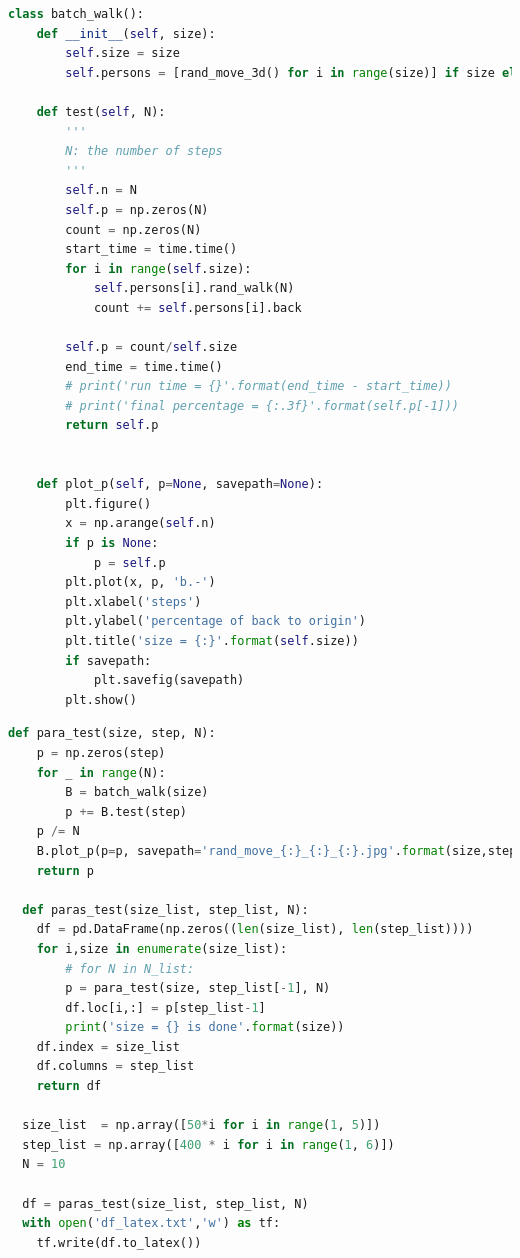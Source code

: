 \documentclass[12pt]{article}
\begin{document}
\begin{lstlisting}[language=Python, caption = 随机游走类与批量游走类]
  class batch_walk():
    def __init__(self, size):
        self.size = size
        self.persons = [rand_move_3d() for i in range(size)] if size else None

    def test(self, N):
        '''
        N: the number of steps
        '''
        self.n = N
        self.p = np.zeros(N)
        count = np.zeros(N)
        start_time = time.time()
        for i in range(self.size):
            self.persons[i].rand_walk(N)
            count += self.persons[i].back

        self.p = count/self.size
        end_time = time.time()
        # print('run time = {}'.format(end_time - start_time))
        # print('final percentage = {:.3f}'.format(self.p[-1]))
        return self.p
                
    
    def plot_p(self, p=None, savepath=None):
        plt.figure()
        x = np.arange(self.n)
        if p is None:
            p = self.p
        plt.plot(x, p, 'b.-')
        plt.xlabel('steps')
        plt.ylabel('percentage of back to origin')
        plt.title('size = {:}'.format(self.size))
        if savepath:
            plt.savefig(savepath)
        plt.show()
\end{lstlisting}

\begin{lstlisting}[language = python, caption = 测试模块]
  def para_test(size, step, N):
    p = np.zeros(step)
    for _ in range(N):
        B = batch_walk(size)
        p += B.test(step)
    p /= N
    B.plot_p(p=p, savepath='rand_move_{:}_{:}_{:}.jpg'.format(size,step,N))
    return p

  def paras_test(size_list, step_list, N):
    df = pd.DataFrame(np.zeros((len(size_list), len(step_list))))
    for i,size in enumerate(size_list):
        # for N in N_list:
        p = para_test(size, step_list[-1], N)
        df.loc[i,:] = p[step_list-1]
        print('size = {} is done'.format(size))
    df.index = size_list
    df.columns = step_list
    return df

  size_list  = np.array([50*i for i in range(1, 5)])
  step_list = np.array([400 * i for i in range(1, 6)])
  N = 10

  df = paras_test(size_list, step_list, N)
  with open('df_latex.txt','w') as tf:
    tf.write(df.to_latex())
\end{lstlisting}
\end{document}
